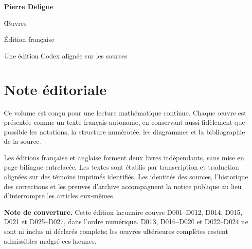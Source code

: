 \documentclass[11pt,a4paper]{article}
\begin{document}
\begin{titlepage}
  \pagecolor{DeligneBlue}
  \color{white}
  \vspace*{34mm}
  {\fontsize{30}{36}\selectfont\bfseries Pierre Deligne\par}
  \vspace{7mm}
  {\fontsize{18}{23}\selectfont Œuvres\par}
  \vspace{4mm}
  {\large Édition française\par}
  \vfill
  {\normalsize Une édition Codex alignée sur les sources\par}
\end{titlepage}
\setcounter{page}{2}
\nopagecolor
\color{DeligneInk}
\section*{Note éditoriale}
Ce volume est conçu pour une lecture mathématique continue. Chaque œuvre est présentée comme un texte français autonome, en conservant aussi fidèlement que possible les notations, la structure numérotée, les diagrammes et la bibliographie de la source.

Les éditions française et anglaise forment deux livres indépendants, sans mise en page bilingue entrelacée. Les textes sont établis par transcription et traduction alignées sur des témoins imprimés identifiés. Les identités des sources, l'historique des corrections et les preuves d'archive accompagnent la notice publique au lieu d'interrompre les articles eux-mêmes.

\textbf{Note de couverture.} Cette édition lacunaire couvre D001--D012, D014, D015, D021 et D025--D027, dans l'ordre numérique. D013, D016--D020 et D022--D024 ne sont ni inclus ni déclarés complets; les œuvres ultérieures complètes restent admissibles malgré ces lacunes.
\end{document}
